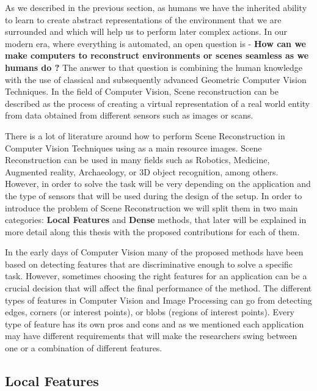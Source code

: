 As we described in the previous section, as humans we have the inherited ability to learn to create abstract representations of the environment that we are surrounded and which will help us to perform later complex actions. In our modern era, where everything is automated, an open question is - \textbf{How can we make computers to reconstruct environments or scenes seamless as we humans do ?} The answer to that question is combining the human knowledge with the use of classical and subsequently advanced Geometric Computer Vision Techniques. In the field of Computer Vision, Scene reconstruction can be described as the process of creating a virtual representation of a real world entity from data obtained from different sensors such as images or scans.

There is a lot of literature around how to perform Scene Reconstruction in Computer Vision Techniques using as a main resource images. Scene Reconstruction can be used in many fields such as Robotics, Medicine, Augmented reality, Archaeology, or 3D object recognition, among others. However, in order to solve the task will be very depending on the application and the type of sensors that will be used during the design of the setup. In order to introduce the problem of Scene Reconstruction we will split them in two main categories: \textbf{Local Features} and \textbf{Dense} methods, that later will be explained in more detail along this thesis with the proposed contributions for each of them.

In the early days of Computer Vision many of the proposed methods have been based on detecting features that are discriminative enough to solve a specific task. However, sometimes choosing the right features for an application can be a crucial decision that will affect the final performance of the method. The different types of features in Computer Vision and Image Processing can go from detecting edges, corners (or interest points), or blobs (regions of interest points). Every type of feature has its own pros and cons and as we mentioned each application may have different requirements that will make the researchers swing between one or a combination of different features.

\subsection{Local Features}


